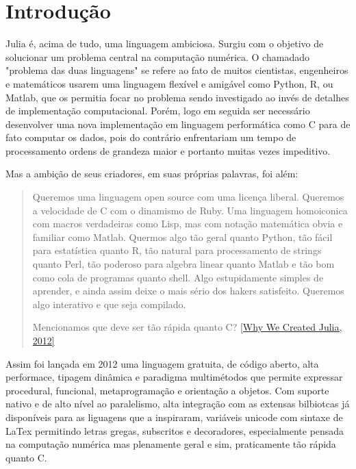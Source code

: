 % 



\chapter{ Introdu\c{c}\~{a}o}

Julia é, acima de tudo, uma linguagem ambiciosa. 
Surgiu com o objetivo de solucionar um problema central na computação numérica. O chamadado "problema das duas linguagens" se refere ao fato de muitos cientistas, engenheiros e matemáticos usarem uma linguagem flexível e amigável como Python, R, ou Matlab, que os permitia focar no problema sendo investigado ao invés de detalhes de implementação computacional. Porém, logo em seguida ser necessário desenvolver uma nova implementação em linguagem performática como C para de fato computar os dados, pois do contrário enfrentariam um tempo de processamento ordens de grandeza maior e portanto muitas vezes impeditivo. \cite{Lauwens2019}

Mas a ambição de seus criadores, em suas próprias palavras, foi além:

\begin{quote}
   Queremos uma linguagem open source com uma licença liberal. Queremos a velocidade de C com o dinamismo de Ruby. Uma linguagem homoiconica com macros verdadeiras como Lisp, mas com notação matemática obvia e familiar como Matlab. Quermos algo tão geral quanto Python, tão fácil para estatística quanto R, tão natural para processamento de strings quanto Perl, tão poderoso para algebra linear quanto Matlab e tão bom como cola de programas quanto shell. Algo estupidamente simples de aprender, e ainda assim deixe o mais sério dos hakers satisfeito. Queremos algo interativo e que seja compilado. 
   
   Mencionamos que deve ser tão rápida quanto C? 
   \href{https://julialang.org/blog/2012/02/why-we-created-julia/}{[Why We Created Julia, 2012]}
   
   
\end{quote}

Assim foi lançada em 2012 uma linguagem gratuita, de código aberto, alta performace, tipagem dinâmica e paradigma multimétodos que permite expressar procedural, funcional, metaprogramação e orientação a objetos. Com suporte nativo e de alto nível ao paralelismo, alta integração com as extensas bilbiotcas já disponíveis para as liguagens que a inspiraram, variáveis unicode com sintaxe de LaTex permitindo letras gregas, subscritos e decoradores, especialmente pensada na computação numérica mas plenamente geral e sim, praticamente tão rápida quanto C. \cite{Lobianco2019,Bezanson2017}





